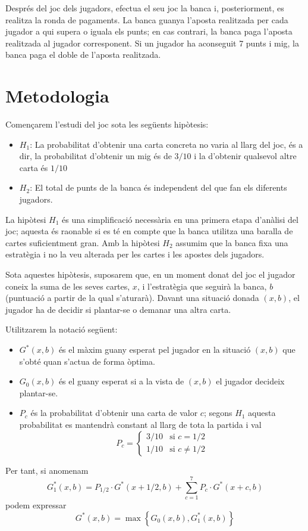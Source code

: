 \documentclass[9pt]{IEEEtran}
\begin{document}
Després del joc dels jugadors, efectua el seu joc la banca i, posteriorment, es realitza la ronda de pagaments. La banca guanya l'aposta realitzada per cada jugador a qui supera o iguala els punts; en cas contrari, la banca paga l'aposta realitzada al jugador corresponent. Si un jugador ha aconseguit 7 punts i mig, la banca paga el doble de l'aposta realitzada.

\section{Metodologia}

Començarem l'estudi del joc sota les següents hipòtesis:
\begin{itemize}
\item $H_1$: La probabilitat d'obtenir una carta concreta no varia al llarg del joc, és a dir, la probabilitat d'obtenir un mig és de $3/10$ i la d'obtenir qualsevol altre carta és $1/10$
\item $H_2$: El total de punts de la banca és independent del que fan els diferents jugadors.
\end{itemize}
La hipòtesi $H_1$ és una simplificació necessària en una primera etapa d'anàlisi del joc; aquesta és raonable si es té en compte que la banca utilitza una baralla de cartes suficientment gran. Amb la hipòtesi $H_2$ assumim que la banca fixa una estratègia i no la veu alterada per les cartes i les apostes dels jugadors.

Sota aquestes hipòtesis,  suposarem que, en un moment donat del joc el jugador coneix la suma de les seves cartes, $x$, i l'estratègia que seguirà la banca, $b$ (puntuació a partir de la qual s'aturarà). Davant una situació donada $(x,b)$, el jugador ha de decidir si plantar-se o demanar una altra carta.

Utilitzarem la notació següent:
\begin{itemize}
\item $G^*(x,b)$ és el màxim guany esperat pel jugador en la situació $(x,b)$ que s'obté quan s'actua de forma òptima.
\item $G_0(x,b)$ és el guany esperat si a la vista de $(x,b)$ el jugador decideix plantar-se.
\item $P_c$ és la probabilitat d'obtenir una carta de valor $c$; segons $H_1$ aquesta probabilitat es mantendrà constant al llarg de tota la partida i val
$$P_c = \begin{cases}
3/10 & \text{si } c = 1/2 \\
1/10 & \text{si } c \not = 1/2
\end{cases}$$
\end{itemize}
Per tant, si anomenam 
$$G_1^*(x,b) =  P_{1/2}\cdot G^*(x + 1/2,b) + \sum_{c=1}^7P_c \cdot G^*(x+c,b)$$
podem expressar 
\begin{equation}
G^*(x,b) = \max \left\{G_0(x,b) , G_1^*(x,b)\right\}
\label{eqGEstrella}
\end{equation}
\end{document}
